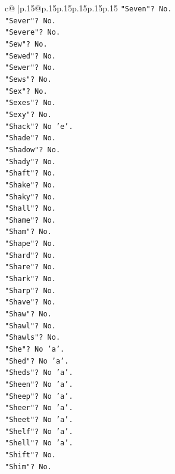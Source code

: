 \documentclass{article}
\begin{document}
{\begin{supertabular}{c@{$\;$}|p{.15\linewidth}@{}p{.15\linewidth}p{.15\linewidth}p{.15\linewidth}p{.15\linewidth}p{.15\linewidth}}
{{{\texttt{"Seven"? No.} \\
\texttt{"Sever"? No.} \\
\texttt{"Severe"? No.} \\
\texttt{"Sew"? No.} \\
\texttt{"Sewed"? No.} \\
\texttt{"Sewer"? No.} \\
\texttt{"Sews"? No.} \\
\texttt{"Sex"? No.} \\
\texttt{"Sexes"? No.} \\
\texttt{"Sexy"? No.} \\
\texttt{"Shack"? No 'e'.} \\
\texttt{"Shade"? No.} \\
\texttt{"Shadow"? No.} \\
\texttt{"Shady"? No.} \\
\texttt{"Shaft"? No.} \\
\texttt{"Shake"? No.} \\
\texttt{"Shaky"? No.} \\
\texttt{"Shall"? No.} \\
\texttt{"Shame"? No.} \\
\texttt{"Sham"? No.} \\
\texttt{"Shape"? No.} \\
\texttt{"Shard"? No.} \\
\texttt{"Share"? No.} \\
\texttt{"Shark"? No.} \\
\texttt{"Sharp"? No.} \\
\texttt{"Shave"? No.} \\
\texttt{"Shaw"? No.} \\
\texttt{"Shawl"? No.} \\
\texttt{"Shawls"? No.} \\
\texttt{"She"? No 'a'.} \\
\texttt{"Shed"? No 'a'.} \\
\texttt{"Sheds"? No 'a'.} \\
\texttt{"Sheen"? No 'a'.} \\
\texttt{"Sheep"? No 'a'.} \\
\texttt{"Sheer"? No 'a'.} \\
\texttt{"Sheet"? No 'a'.} \\
\texttt{"Shelf"? No 'a'.} \\
\texttt{"Shell"? No 'a'.} \\
\texttt{"Shift"? No.} \\
\texttt{"Shim"? No.} \\
}}}
\end{supertabular}}
\end{document}

